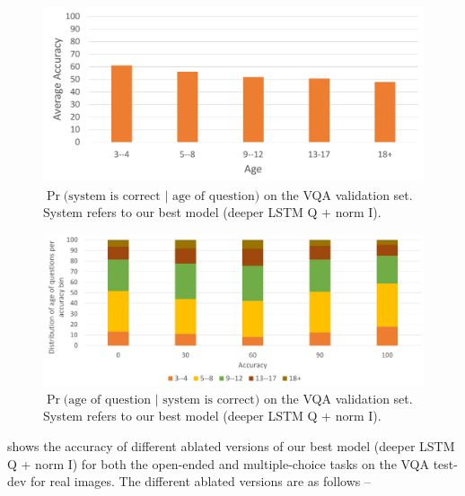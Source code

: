 \begin{figure}[h]
\includegraphics[width=1\linewidth]{figures/OpenEnded_val2014_predAgeDict2.pdf}
\centering
\caption{$\Pr\text{(system is correct } | \text{ age of question)}$ on the VQA validation set. System refers to our best model (deeper LSTM Q + norm I).}
\label{fig:age_1}
\end{figure}
\begin{figure}[h]
\includegraphics[width=1\linewidth]{figures/OpenEnded_val2014_predAgeDict1.pdf}
\centering
\caption{$\Pr\text{(age of question } | \text{ system is correct)}$ on the VQA validation set. System refers to our best model (deeper LSTM Q + norm I).}
\label{fig:age_2}
\end{figure}

 shows the accuracy of different ablated versions of our best model (deeper LSTM Q + norm I) for both the open-ended and multiple-choice tasks on the VQA test-dev for real images. The different ablated versions are as follows --

